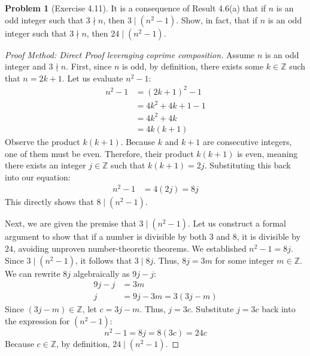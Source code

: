 \documentclass[11pt]{article}
\theoremstyle{definition}
\newtheorem{problem}{Problem}
\theoremstyle{remark}
\begin{document}
\vspace{1em}

\begin{problem}[Exercise 4.11]
It is a consequence of Result 4.6(a) that if $n$ is an odd integer such that $3 \nmid n$, then $3 \mid (n^2 - 1)$. Show, in fact, that if $n$ is an odd integer such that $3 \nmid n$, then $24 \mid (n^2 - 1)$.
\end{problem}
\begin{proof}[Proof Method: Direct Proof leveraging coprime composition]
Assume $n$ is an odd integer and $3 \nmid n$. 
First, since $n$ is odd, by definition, there exists some $k \in \mathbb{Z}$ such that $n = 2k + 1$. Let us evaluate $n^2 - 1$:
\begin{align*}
n^2 - 1 &= (2k + 1)^2 - 1 \\
&= 4k^2 + 4k + 1 - 1 \\
&= 4k^2 + 4k \\
&= 4k(k + 1)
\end{align*}
Observe the product $k(k+1)$. Because $k$ and $k+1$ are consecutive integers, one of them must be even. Therefore, their product $k(k+1)$ is even, meaning there exists an integer $j \in \mathbb{Z}$ such that $k(k+1) = 2j$.
Substituting this back into our equation:
\begin{align*}
n^2 - 1 &= 4(2j) = 8j
\end{align*}
This directly shows that $8 \mid (n^2 - 1)$.

Next, we are given the premise that $3 \mid (n^2 - 1)$. Let us construct a formal argument to show that if a number is divisible by both $3$ and $8$, it is divisible by $24$, avoiding unproven number-theoretic theorems.
We established $n^2 - 1 = 8j$. Since $3 \mid (n^2 - 1)$, it follows that $3 \mid 8j$. Thus, $8j = 3m$ for some integer $m \in \mathbb{Z}$.
We can rewrite $8j$ algebraically as $9j - j$:
\begin{align*}
9j - j &= 3m \\
j &= 9j - 3m = 3(3j - m)
\end{align*}
Since $(3j - m) \in \mathbb{Z}$, let $c = 3j - m$. Thus, $j = 3c$. 
Substitute $j = 3c$ back into the expression for $(n^2 - 1)$:
\[ n^2 - 1 = 8j = 8(3c) = 24c \]
Because $c \in \mathbb{Z}$, by definition, $24 \mid (n^2 - 1)$.
\end{proof}

\vspace{1em}
\end{document}
